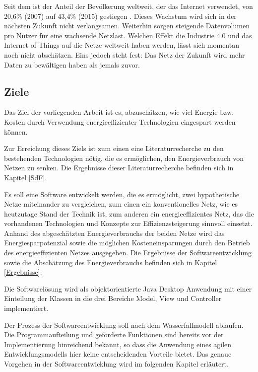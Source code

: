 \documentclass[12pt,titlepage]{article}
\begin{document}
Seit dem ist der Anteil der Bevölkerung weltweit, der das Internet verwendet, von 20,6\% (2007) auf 43,4\% (2015) gestiegen \cite{itu}. Dieses Wachstum wird sich in der nächsten Zukunft nicht verlangsamen. Weiterhin sorgen steigende Datenvolumen pro Nutzer für eine wachsende Netzlast. Welchen Effekt die Industrie 4.0 und das Internet of Things auf die Netze weltweit haben werden, lässt sich momentan  noch nicht abschätzen. Eins jedoch steht fest: Das Netz der Zukunft wird mehr Daten zu bewältigen haben als jemals zuvor.




\subsection{Ziele}
Das Ziel der vorliegenden Arbeit ist es, abzuschätzen, wie viel Energie bzw. Kosten  durch Verwendung energieeffizienter Technologien eingespart werden können.

Zur Erreichung dieses Ziels ist zum einen eine Literaturrecherche zu den bestehenden Technologien nötig, die es ermöglichen, den Energieverbrauch von Netzen zu senken. Die Ergebnisse dieser Literaturrecherche befinden sich in Kapitel \ref{SdF}.

Es soll eine Software entwickelt werden, die es ermöglicht, zwei hypothetische Netze miteinander zu vergleichen, zum einen ein konventionelles Netz, wie es heutzutage Stand der Technik ist, zum anderen ein energieeffizientes Netz, das die vorhandenen Technologien und Konzepte zur Effizienzsteigerung sinnvoll einsetzt. Anhand des abgeschätzten Energieverbrauchs der beiden Netze wird das Energiesparpotenzial sowie die möglichen Kosteneinsparungen durch den Betrieb des energieeffizienten Netzes ausgegeben. Die Ergebnisse der Softwareentwicklung sowie die Abschätzung des Energieverbrauchs befinden sich in Kapitel \ref{Ergebnisse}.

Die Softwarelösung wird als objektorientierte Java Desktop Anwendung mit einer Einteilung der Klassen in die drei Bereiche Model, View und Controller implementiert.

Der Prozess der Softwareentwicklung soll nach dem Wasserfallmodell ablaufen. Die Programmaufteilung und geforderte Funktionen sind bereits vor der Implementierung hinreichend bekannt, so dass die Anwendung eines agilen Entwicklungsmodells hier keine entscheidenden Vorteile bietet. Das genaue Vorgehen in der Softwareentwicklung wird im folgenden Kapitel erläutert.
\end{document}
